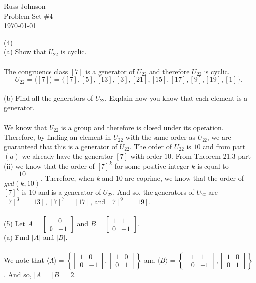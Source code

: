 \documentclass[11pt,a4paper]{article}
\begin{document}
\begin{flushright}
Russ Johnson\\
Problem Set $\#4$\\
\today\\
\end{flushright}

(4)\\
{ (a)} Show that $U_{22}$ is cyclic.\\
~\\
The congruence class $[7]$ is a generator of $U_{22}$ and therefore $U_{22}$ is cyclic.
\[U_{22} = \langle [7] \rangle = \{[7], [5],[13],[3],[21],[15],[17],[9],[19],[1]\}.\]
~\\
{ (b)} Find all the generators of $U_{22}$. Explain how you know that each element is a generator.\\
~\\
We know that $U_{22}$ is a group and therefore is closed under its operation. Therefore, by finding an element in $U_{22}$ with the same order as $U_{22}$, we are guaranteed that this is a generator of $U_{22}$. The order of $U_{22}$ is $10$ and from part $(a)$ we already have the generator $[7]$ with order $10$. From Theorem 21.3 part (ii) we know that the order of $[7]^k$ for some positive integer $k$ is equal to $\dfrac{10}{gcd(k,10)}$. Therefore, when $k$ and $10$ are coprime, we know that the order of $[7]^k$ is $10$ and is a generator of $U_{22}$. And so, the generators of $U_{22}$ are $[7]^3 = [13]$, $[7]^7 = [17]$, and $[7]^9 = [19]$.\\
~\\
{(5)} Let $A = \begin{bmatrix}1&0\\0&-1\end{bmatrix} $ and $B = \begin{bmatrix}1&1\\0&-1\end{bmatrix}$.\\
{(a)} Find $|A|$ and $|B|$.\\
~\\
We note that $\langle A \rangle =\left\{ \begin{bmatrix}1&0\\0&-1\end{bmatrix}, \begin{bmatrix}1&0\\0&1\end{bmatrix} \right\}$ and  $\langle B \rangle = \left\{ \begin{bmatrix}1&1\\0&-1\end{bmatrix}, \begin{bmatrix}1&0\\0&1\end{bmatrix} \right\}$. And so, $|A| = |B| = 2$.
\end{document}
